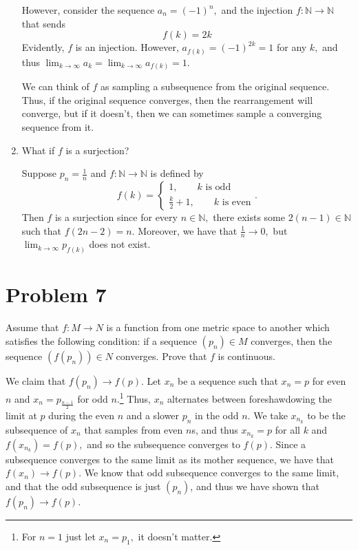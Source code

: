 \documentclass[11pt]{article}
\newcommand{\bbN}{\mathbb{N}}
\begin{document}
\begin{enumerate}
\begin{solution}
        However, consider the sequence $a_n = (-1)^n,$ and the injection $f: \bbN \to \bbN$ that sends
        \[f(k) = 2k\] Evidently, $f$ is an injection. However, $a_{f(k)} = (-1)^{2k} = 1$ for any $k,$ and thus $\displaystyle\lim_{k\to \infty}a_{k}= \displaystyle\lim_{k\to \infty}a_{f(k)} = 1.$
    \end{solution}
    \begin{reflection}
    We can think of $f$ as sampling a subsequence from the original sequence. Thus, if the original sequence converges, then the rearrangement will converge, but if it doesn't, then we can sometimes sample a converging sequence from it.
    \end{reflection}
    \item 
    \begin{problem}
    What if $f$ is a surjection?
    \end{problem}
    \begin{solution}
    Suppose $p_n = \frac{1}{n}$ and $f: \bbN \to \bbN$ is defined by 
    \[f(k) = \begin{cases}
        1, \qquad \text{$k$ is odd}\\
        \frac{k}{2}+1, \qquad \text{$k$ is even}
    \end{cases}.\] Then $f$ is a surjection since for every $n\in \bbN,$ there exists some $2(n-1)\in \bbN$ such that $f(2n-2) = n.$ Moreover, we have that $\frac{1}{n}\to 0,$ but $\lim_{k\to \infty}p_{f(k)}$ does not exist.
    \end{solution}
\end{enumerate}

\newpage
\section*{Problem 7}
\begin{problem}
Assume that $f: M \to N$ is a function from one metric space to another which satisfies the following condition: if a sequence $(p_n)\in M$ converges, then the sequence $(f(p_n))\in N$ converges. Prove that $f$ is continuous.
\end{problem}
\begin{solution}
    We claim that $f(p_n) \to f(p).$ Let $x_n$ be a sequence such that $x_n = p$ for even $n$ and $x_n = p_{\frac{n-1}{2}}$ for odd $n$.\footnote{For $n =1$ just let $x_n = p_1,$ it doesn't matter.} Thus, $x_n$ alternates between foreshawdowing the limit at $p$ during the even $n$ and a slower $p_n$ in the odd $n.$ We take $x_{n_k}$ to be the subsequence of $x_n$ that samples from even $n$s, and thus $x_{n_k} = p$ for all $k$ and $f(x_{n_k}) = f(p),$ and so the subsequence converges to $f(p).$ Since a subsequence converges to the same limit as its mother sequence, we have that $f(x_n)\to f(p).$ We know that odd subsequence converges to the same limit, and that the odd subsequence is just $(p_n)$, and thus we have shown that $f(p_n)\to f(p).$ 
\end{solution}
\newpage
\end{document}

